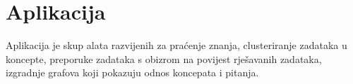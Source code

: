 \chapter{Aplikacija}

	Aplikacija je skup alata razvijenih za praćenje znanja, clusteriranje zadataka u koncepte, preporuke zadataka s obizrom na povijest rješavanih zadataka, izgradnje grafova koji pokazuju odnos koncepata i pitanja.
	
	
	\begin{comment}
		Knowledge tracing
		- bayesian knowledge tracing- input su dataset za određeni "ispit",pragovi za cutoff,gauss,bkt -potencijalno slideri sa listenerima pa se prema tome mijenja graf?
			-output: graf koji pokazuje odnos koncepata (usmjereni graf)
			-prvo treba proci vrijeme dok se izracunaju parametri za bkt -bilo bi dobro imati mogucnost sejvanja generiranih parametara u neki pikl?
			-kod procesuiranja google formsa u dataset treba dati pravilan redoslijed naziva koncepata
		OGRANIČENJA- u datasetu svi korisnici moraju rijesiti sve zadatke i to istim redoslijedom
		
		ExRec-
		KT dio- moguce izvrsiti samo jednom za neki dataset i onda spremiti parametre u neki pikl koji se moze kasnije kako bi bilo brze
		Izracun matrice relevantnosti preko SAKT-a se isto moze jednom izvrsiti i onda se objekt klase "PersonalCandidates" ili sama matrica mogu spremiti kao pikl i koristiti kasnije, mozda bolje matrica jer za PersonalCandidates postoje varijabilni argumenti
		PersonalCandidates- ima mogucnost razlicith normalizacijskih funkcija i funkcija praga te same vrijednosti praga

		Recommmendation system ima ulaz parametre dobivene iz kt dijela, student traces (tu bi moglo staviti da se upisu zadaci i tocno/netocno ili da se ucita iz nekog fajla pa da se onda da preporuku i opciju da li da se radi samo sakt preporuka ili sakt + rs)
		
		Clustering
		-k-mediods - uz input min,max broj koncepata i ulazni dataset daje procjenu koliko zapravo koncepata ima
					-uz dani broj koncepata clusterira pitanja u različite koncepte
					-ograničenja su jednaka kao za bkt
					
		-zvonimir
		
		-bkt izgradnja grafa gdje se pitanja gledaju kao koncepti (to bi vjerojatno trebalo preraditi i trebalo bi se igrati sa parametrima)
			-trenutno se za izgradnju prima googleforms file, treba generalizirati za opceniti dataset
			-treba promijena funkcija get_student_concept_mastery
		-pomocne skripte- obrada google formsa, generiranje umjetnog dataseta
		
	\end{comment}
	 
	
	